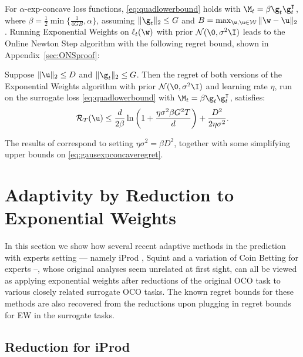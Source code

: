 \documentclass{colt2018} %
\renewcommand{\top}{\intercal}
\newcommand{\domainw}{\mathcal{W}}
\newcommand{\normal}{\mathcal{N}}       %
\newcommand{\sloss}{\ell}                       %
\newcommand{\regret}{\mathcal{R}}
\begin{document}
For $\alpha$-exp-concave loss functions, \eqref{eq:quadlowerbound} holds
with $\M_t = \beta \g_t \g_t^\top$, where $\beta = \frac{1}{2}
\min\{\frac{1}{4GB}, \alpha\}$, assuming $\|\g_t\|_2 \leq G$ and $B = \max_{\w, \u \in \domainw} \|\w - \u\|_2$ \citep[Lemma 3]{HazanAgarwalKale2007}.
Running Exponential Weights on $\sloss_t(\w)$ with prior $\normal(\0,
\sigma^2\I)$ leads to the Online Newton Step algorithm
\citep{HazanAgarwalKale2007} with the following regret bound, shown in
Appendix~\ref{sec:ONSproof}:
% 
% 
\begin{corollary}\label{lem:gausexpconcaveregret}
Suppose $\|\u\|_2 \leq D$ and $\|\g_t\|_2 \leq G$. Then the regret of
both versions of the Exponential Weights algorithm with prior
$\normal(\0, \sigma^2 \I)$ and learning rate $\eta$, run on the
surrogate loss \eqref{eq:quadlowerbound} with $\M_t = \beta \g_t
\g_t^\top$, satisfies:
\begin{equation}\label{eq:gausexpconcaveregret}
    \regret_T(\u) \leq         \frac{d}{2\beta}\ln\left(1 + \frac{\eta \sigma^2\beta G^2 T}{d} \right)
    + \frac{D^2}{2\eta\sigma^2}.
\end{equation}
\end{corollary}
% 
The results of \citet{HazanAgarwalKale2007} correspond to setting
% 
$\eta \sigma^2 = \beta D^2$, together with some simplifying upper bounds
on \eqref{eq:gausexpconcaveregret}.

\section{Adaptivity by Reduction to Exponential Weights}
\label{sec:adaptivity}

% 
% 
% 
% 
% 
% 
% 
% 
In this section we show how several recent adaptive
 methods in the prediction with experts
setting --- namely iProd \citep{KoolenVanErven2015}, Squint
\citep{KoolenVanErven2015} and a variation of Coin Betting for experts
\citep{OrabonaPal2016} --, whose original analyses seem unrelated at
first sight, can all be viewed as applying exponential weights after
reductions of the original OCO task to various closely related surrogate
OCO tasks. The known regret bounds for these methods are also 
recovered from the reductions upon plugging in regret bounds for EW in the
surrogate tasks.
% 
% 
% 
% 
% 

\subsection{Reduction for iProd}
\end{document}
